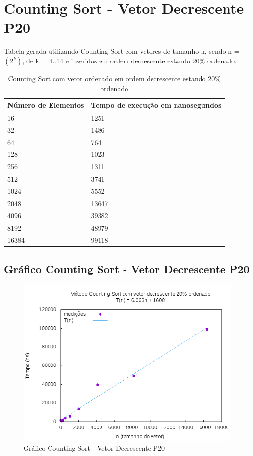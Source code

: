\documentclass[12pt,a4paper,twoside]{report}
\begin{document}
\section{Counting Sort - Vetor Decrescente P20}
Tabela gerada utilizando Counting Sort com vetores de tamanho n, sendo n = $(2^k)$, de k = 4..14 e inseridos em ordem decrescente estando 20\% ordenado.
\begin{table}[H]
\centering
\caption{Counting Sort com vetor ordenado em ordem decrescente estando 20\% ordenado}
\label{my-label}
\begin{tabular}{|l|l|}
\hline
\multicolumn{1}{|c|}{\textbf{Número de Elementos}} & \multicolumn{1}{c|}{\textbf{Tempo de execução em nanosegundos}} \\ \hline
16 & 1251 \\ \hline
32 & 1486 \\ \hline
64 & 764 \\ \hline
128 & 1023 \\ \hline
256 & 1311 \\ \hline
512 & 3741 \\ \hline
1024 & 5552 \\ \hline
2048 & 13647 \\ \hline
4096 & 39382 \\ \hline
8192 & 48979 \\ \hline
16384 & 99118 \\ \hline
\end{tabular}
\end{table}

\subsection{Gráfico Counting Sort - Vetor Decrescente P20}
\begin{figure}[H]
    \centering
    \includegraphics[width=0.7\linewidth]{graficos/CountingSort/vIntDecrescenteP20/vIntDecrescenteP20.png}
  \caption{Gráfico Counting Sort - Vetor Decrescente P20}
\end{figure}
\end{document}
